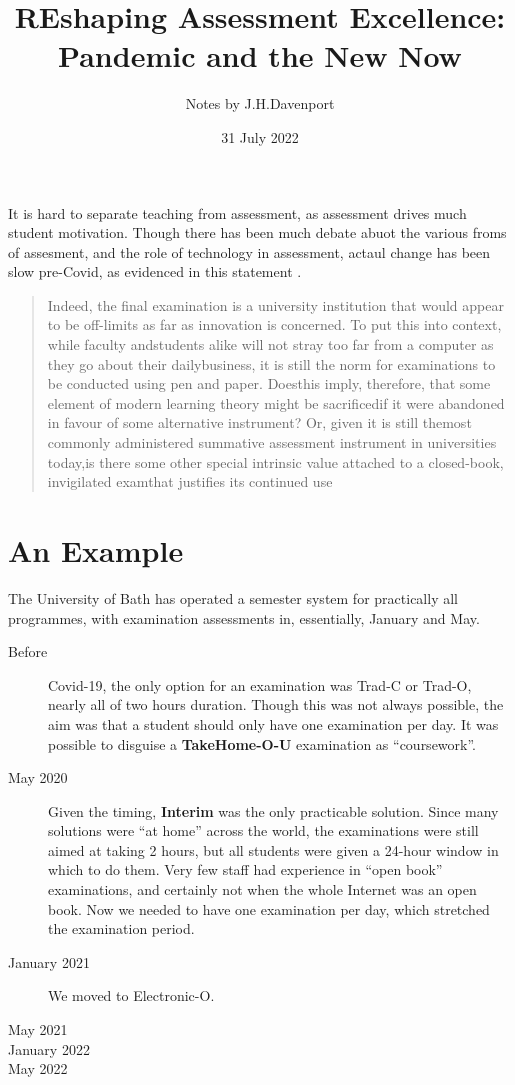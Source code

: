 \documentclass{article}
\begin{document}
\author{Notes by J.H.Davenport}
\title{REshaping Assessment Excellence: Pandemic and the New Now}
\date{31 July 2022}
\maketitle
It is hard to separate teaching from assessment, as assessment drives much student motivation. Though there has been much debate abuot the various froms of assesment, and the role of technology in assessment, actaul change has been slow pre-Covid, as evidenced in this statement \cite{WilliamsWong2009a}.
\begin{quote}
Indeed, the final examination is a university institution that would appear to be off-limits as far as innovation is concerned. To put this into context, while faculty andstudents alike will not stray too far from a computer as they go about their dailybusiness, it is still the norm for examinations to be conducted using pen and paper. Doesthis imply, therefore, that some element of modern learning theory might be sacrificedif it were abandoned in favour of some alternative instrument? Or, given it is still themost commonly administered summative assessment instrument in universities today,is there some other special intrinsic value attached to a closed-book, invigilated examthat justifies its continued use
\end{quote}

\section{An Example}
The University of Bath has operated a semester system for practically all programmes, with examination assessments in, essentially, January and May.
\begin{description}
\item[Before]Covid-19, the only option for an examination was Trad-C or Trad-O, nearly all of two hours duration. Though this was not always possible, the aim was that a student should only have one examination per day. It was possible to disguise a {\bf TakeHome-O-U} examination as ``coursework''.
\item[May 2020]Given the timing, {\bf Interim} was the only practicable solution. Since many solutions were ``at home'' across the world, the examinations were still aimed at taking 2 hours, but all students were given a 24-hour window in which to do them. Very few staff had experience in ``open book'' examinations, and certainly not when the whole Internet was an open book. Now we needed to have one examination per day, which stretched the examination period.
\item[January 2021]We moved to Electronic-O.
\item[May 2021]
\item[January 2022]
\item[May 2022]
\end{description}
\def\r{$\rightarrow$}
\end{document}
